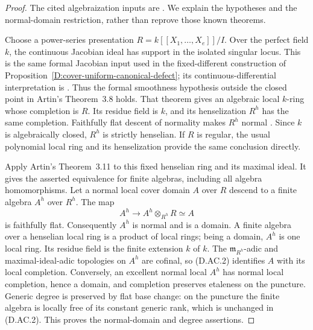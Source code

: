 \begin{proof}
The cited algebraization inputs are
\citet[Theorems~3.8--3.9 and~3.11, with Lemmas~3.12 and~3.17,
pp.~32--38]{Artin1969ApproximationD}. We explain the hypotheses
and the normal-domain restriction, rather than reprove those
known theorems.

Choose a power-series presentation $R=k[[X_1,\ldots,X_e]]/I$.
Over the perfect field $k$, the continuous Jacobian ideal has
support in the isolated singular locus. This is the same
formal Jacobian input used in the fixed-different construction
of Proposition~\ref{D:cover-uniform-canonical-defect}; its
continuous-differential interpretation is
\citet[Example~3.3, p.~7]{C_IyengarTakahashiStable}.
Thus the formal smoothness hypothesis outside the closed point
in Artin's Theorem~3.8 holds. That theorem gives an algebraic
local $k$-ring whose completion is $R$. Its residue field is
$k$, and its henselization $R^h$ has the same completion.
Faithfully flat descent of normality makes $R^h$ normal
\citep[Lemma~10.164.3, Tag~033G]{StacksCompleteBudgetD}.
Since $k$ is algebraically closed, $R^h$ is strictly henselian.
If $R$ is regular, the usual polynomial local ring and its
henselization provide the same conclusion directly.

Apply Artin's Theorem~3.11 to this fixed henselian ring and
its maximal ideal. It gives the asserted equivalence for
finite algebras, including all algebra homomorphisms. Let a
normal local cover domain $A$ over $R$ descend to a finite
algebra $A^h$ over $R^h$. The map
\[
              A^h\longrightarrow A^h\otimes_{R^h}R\simeq A
                                                               \tag{D.AC.2}
\]
is faithfully flat. Consequently $A^h$ is normal and is a
domain. A finite algebra over a henselian local ring is a
product of local rings; being a domain, $A^h$ is one local
ring. Its residue field is the finite extension $k$ of $k$.
The $\mathfrak m_{R^h}$-adic and maximal-ideal-adic topologies
on $A^h$ are cofinal, so (D.AC.2) identifies $A$ with its
local completion. Conversely, an excellent normal local
$A^h$ has normal local completion, hence a domain, and
completion preserves etaleness on the puncture. Generic
degree is preserved by flat base change: on the puncture
the finite algebra is locally free of its constant generic
rank, which is unchanged in (D.AC.2). This proves the
normal-domain and degree assertions.
\end{proof}

